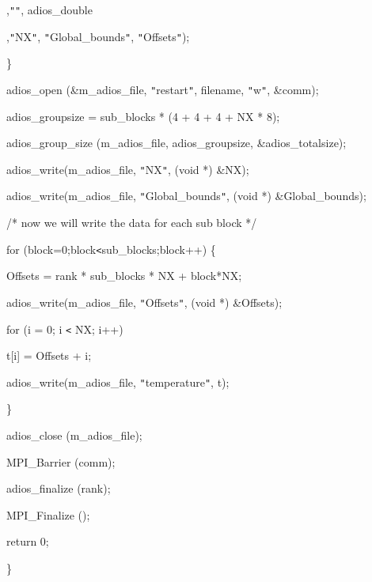 \parindent=86pt
,\texttt{"}\texttt{"}, adios\_double

,\texttt{"}NX\texttt{"}, \texttt{"}Global\_bounds\texttt{"}, \texttt{"}Offsets\texttt{"});

\parindent=115pt
\}

\parindent=28pt
adios\_open (\&m\_adios\_file, \texttt{"}restart\texttt{"}, filename, \texttt{"}w\texttt{"}, 
\&comm);

adios\_groupsize = sub\_blocks * (4 + 4 + 4 + NX * 8);

\parindent=57pt
adios\_group\_size (m\_adios\_file, adios\_groupsize, \&adios\_totalsize);

\parindent=28pt
adios\_write(m\_adios\_file, \texttt{"}NX\texttt{"}, (void *) \&NX);

adios\_write(m\_adios\_file, \texttt{"}Global\_bounds\texttt{"}, (void *) \&Global\_bounds);

\parindent=54pt
/* now we will write the data for each sub block */

\parindent=28pt
for (block=0;block\texttt{<}sub\_blocks;block++) \{

\parindent=39pt
Offsets = rank * sub\_blocks * NX + block*NX;

adios\_write(m\_adios\_file, \texttt{"}Offsets\texttt{"}, (void *) \&Offsets);

\parindent=79pt
for (i = 0; i \texttt{<} NX; i++)

\parindent=54pt
t[i] = Offsets + i;

\parindent=39pt
adios\_write(m\_adios\_file, \texttt{"}temperature\texttt{"}, t);

\parindent=28pt
\}

adios\_close (m\_adios\_file);

\parindent=57pt
MPI\_Barrier (comm);

\parindent=28pt
adios\_finalize (rank);

MPI\_Finalize ();

\parindent=57pt
return 0;

\parindent=0pt
\}
